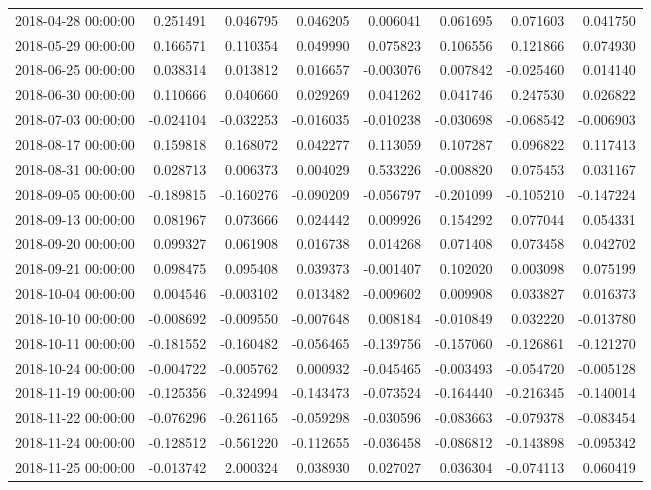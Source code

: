 \begin{tabular}{lrrrrrrr}
2018-04-28 00:00:00 & 0.251491 & 0.046795 & 0.046205 & 0.006041 & 0.061695 & 0.071603 & 0.041750 \\
2018-05-29 00:00:00 & 0.166571 & 0.110354 & 0.049990 & 0.075823 & 0.106556 & 0.121866 & 0.074930 \\
2018-06-25 00:00:00 & 0.038314 & 0.013812 & 0.016657 & -0.003076 & 0.007842 & -0.025460 & 0.014140 \\
2018-06-30 00:00:00 & 0.110666 & 0.040660 & 0.029269 & 0.041262 & 0.041746 & 0.247530 & 0.026822 \\
2018-07-03 00:00:00 & -0.024104 & -0.032253 & -0.016035 & -0.010238 & -0.030698 & -0.068542 & -0.006903 \\
2018-08-17 00:00:00 & 0.159818 & 0.168072 & 0.042277 & 0.113059 & 0.107287 & 0.096822 & 0.117413 \\
2018-08-31 00:00:00 & 0.028713 & 0.006373 & 0.004029 & 0.533226 & -0.008820 & 0.075453 & 0.031167 \\
2018-09-05 00:00:00 & -0.189815 & -0.160276 & -0.090209 & -0.056797 & -0.201099 & -0.105210 & -0.147224 \\
2018-09-13 00:00:00 & 0.081967 & 0.073666 & 0.024442 & 0.009926 & 0.154292 & 0.077044 & 0.054331 \\
2018-09-20 00:00:00 & 0.099327 & 0.061908 & 0.016738 & 0.014268 & 0.071408 & 0.073458 & 0.042702 \\
2018-09-21 00:00:00 & 0.098475 & 0.095408 & 0.039373 & -0.001407 & 0.102020 & 0.003098 & 0.075199 \\
2018-10-04 00:00:00 & 0.004546 & -0.003102 & 0.013482 & -0.009602 & 0.009908 & 0.033827 & 0.016373 \\
2018-10-10 00:00:00 & -0.008692 & -0.009550 & -0.007648 & 0.008184 & -0.010849 & 0.032220 & -0.013780 \\
2018-10-11 00:00:00 & -0.181552 & -0.160482 & -0.056465 & -0.139756 & -0.157060 & -0.126861 & -0.121270 \\
2018-10-24 00:00:00 & -0.004722 & -0.005762 & 0.000932 & -0.045465 & -0.003493 & -0.054720 & -0.005128 \\
2018-11-19 00:00:00 & -0.125356 & -0.324994 & -0.143473 & -0.073524 & -0.164440 & -0.216345 & -0.140014 \\
2018-11-22 00:00:00 & -0.076296 & -0.261165 & -0.059298 & -0.030596 & -0.083663 & -0.079378 & -0.083454 \\
2018-11-24 00:00:00 & -0.128512 & -0.561220 & -0.112655 & -0.036458 & -0.086812 & -0.143898 & -0.095342 \\
2018-11-25 00:00:00 & -0.013742 & 2.000324 & 0.038930 & 0.027027 & 0.036304 & -0.074113 & 0.060419 \\

\end{tabular}
